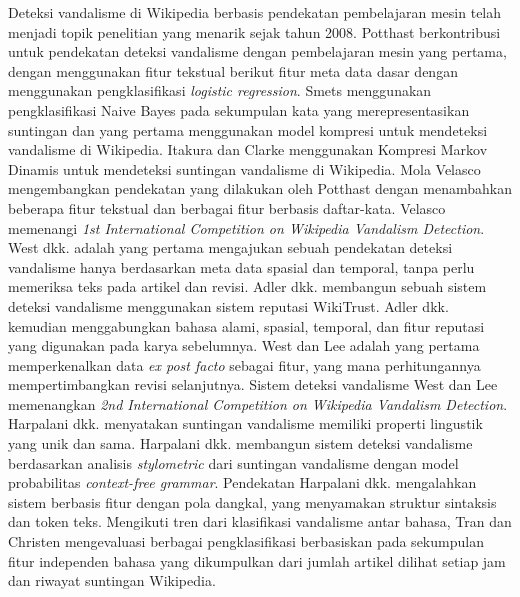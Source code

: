 Deteksi vandalisme di Wikipedia berbasis pendekatan pembelajaran mesin telah
menjadi topik penelitian yang menarik sejak tahun 2008.
Potthast \cite{potthast2008automatic} berkontribusi untuk pendekatan deteksi
vandalisme dengan pembelajaran mesin yang pertama, dengan menggunakan fitur
tekstual berikut fitur meta data dasar dengan menggunakan pengklasifikasi
\textit{logistic regression}.
Smets \cite{smets08automaticvandalism} menggunakan pengklasifikasi Naive Bayes
pada sekumpulan kata yang merepresentasikan suntingan dan yang pertama
menggunakan model kompresi untuk mendeteksi vandalisme di Wikipedia.
Itakura dan Clarke \cite{itakura2009using} menggunakan Kompresi Markov Dinamis
untuk mendeteksi suntingan vandalisme di Wikipedia.
Mola Velasco \cite{mola2012wikipedia} mengembangkan pendekatan yang dilakukan
oleh Potthast \cite{potthast2008automatic} dengan menambahkan beberapa fitur
tekstual dan berbagai fitur berbasis daftar-kata.
Velasco memenangi \textit{1st International Competition on Wikipedia Vandalism
Detection}.  West dkk. \cite{west2011multilingual} adalah yang pertama
mengajukan sebuah pendekatan deteksi vandalisme hanya berdasarkan meta data
spasial dan temporal, tanpa perlu memeriksa teks pada artikel dan revisi.
Adler dkk. \cite{adler2010detecting} membangun sebuah sistem deteksi vandalisme
menggunakan sistem reputasi WikiTrust.
Adler dkk. \cite{adler2011wikipedia} kemudian menggabungkan bahasa alami,
spasial, temporal, dan fitur reputasi yang digunakan pada karya sebelumnya.
West dan Lee \cite{west2011multilingual} adalah yang pertama memperkenalkan
data \textit{ex post facto} sebagai fitur, yang mana perhitungannya
mempertimbangkan revisi selanjutnya.
Sistem deteksi vandalisme West dan Lee memenangkan \textit{2nd International
Competition on Wikipedia Vandalism Detection}.
Harpalani dkk. \cite{harpalani2011language} menyatakan suntingan vandalisme
memiliki properti lingustik yang unik dan sama.
Harpalani dkk. membangun sistem deteksi vandalisme berdasarkan analisis
\textit{stylometric} dari suntingan vandalisme dengan model probabilitas
\textit{context-free grammar}.
Pendekatan Harpalani dkk. mengalahkan sistem berbasis fitur dengan pola
dangkal, yang menyamakan struktur sintaksis dan token teks.
Mengikuti tren dari klasifikasi vandalisme antar bahasa, Tran dan Christen
\cite{tran2013cross} mengevaluasi berbagai pengklasifikasi berbasiskan pada
sekumpulan fitur independen bahasa yang dikumpulkan dari jumlah artikel dilihat
setiap jam dan riwayat suntingan Wikipedia.

